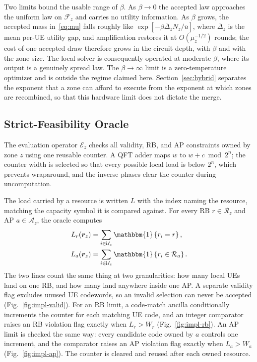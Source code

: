 \documentclass[journal]{IEEEtran}
\newcommand{\calF}{\mathcal{F}}  %
\newcommand{\calU}{\mathcal{U}}  %
\newcommand{\calA}{\mathcal{A}}  %
\newcommand{\calR}{\mathcal{R}}  %
\newcommand{\calE}{\mathcal{E}}  %
\newcommand{\ind}[1]{\mathbbm{1}\left\{#1\right\}}
\begin{document}
Two limits bound the usable range of $\beta$. As $\beta\to0$ the accepted law approaches the uniform law on $\calF_z$ and carries no utility information. As $\beta$ grows, the accepted mass in~\eqref{eq:mu} falls roughly like $\exp[-\beta\overline{\Delta}_zN_z/\bar u]$, where $\overline{\Delta}_z$ is the mean per-UE utility gap, and amplification restores it at $O(\mu_z^{-1/2})$ rounds; the cost of one accepted draw therefore grows in the circuit depth, with $\beta$ and with the zone size. The local solver is consequently operated at moderate $\beta$, where its output is a genuinely spread law. The $\beta\to\infty$ limit is a zero-temperature optimizer and is outside the regime claimed here. Section~\ref{sec:hybrid} separates the exponent that a zone can afford to execute from the exponent at which zones are recombined, so that this hardware limit does not dictate the merge.

\subsection{Strict-Feasibility Oracle}
\label{sec:oracle}

The evaluation operator $\calE_z$ checks all validity, RB, and AP constraints owned by zone $z$ using one reusable counter. A QFT adder maps $w$ to $w+c\bmod 2^n$; the counter width is selected so that every possible local load is below $2^n$, which prevents wraparound, and the inverse phases clear the counter during uncomputation.

The load carried by a resource is written $L$ with the index naming the resource, matching the capacity symbol it is compared against. For every RB $r\in\calR_z$ and AP $a\in\calA_z$, the oracle computes
\begin{equation}
\label{eq:load}
\begin{aligned}
L_r(\bm r_z)
&=\sum_{i\in\calU_z}\ind{r_i=r},\\
L_a(\bm r_z)
&=\sum_{i\in\calU_z}\ind{r_i\in\calR_a}.
\end{aligned}
\end{equation}
The two lines count the same thing at two granularities: how many local UEs land on one RB, and how many land anywhere inside one AP. A separate validity flag excludes unused UE codewords, so an invalid selection can never be accepted (Fig.~\ref{fig:impl-valid}). For an RB limit, a code-match ancilla conditionally increments the counter for each matching UE code, and an integer comparator raises an RB violation flag exactly when $L_r>W_r$ (Fig.~\ref{fig:impl-rb}). An AP limit is checked the same way: every candidate code owned by $a$ controls one increment, and the comparator raises an AP violation flag exactly when $L_a>W_a$ (Fig.~\ref{fig:impl-ap}). The counter is cleared and reused after each owned resource.
\end{document}
